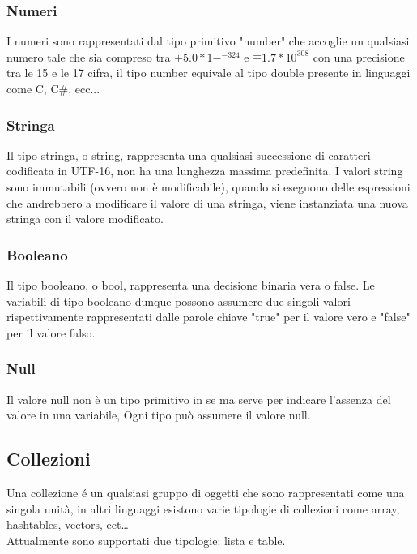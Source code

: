 \subsubsection{Numeri}
I numeri sono rappresentati dal tipo primitivo "number" che accoglie un qualsiasi numero tale che
sia compreso tra \( \pm5.0*1-^{-324} \) e \(\mp 1.7*10^308\) con una precisione tra le 15 e le 17
cifra, il tipo number equivale al tipo double presente in linguaggi come C, C\#, ecc...

\subsubsection{Stringa}
Il tipo stringa, o string, rappresenta una qualsiasi successione di caratteri codificata in UTF-16, 
non ha una lunghezza massima predefinita.
I valori string sono immutabili (ovvero non è modificabile), quando si eseguono delle espressioni
che andrebbero a modificare il valore di una stringa, viene instanziata una nuova stringa con il valore
modificato.

\subsubsection{Booleano}
Il tipo booleano, o bool, rappresenta una decisione binaria vera o false.
Le variabili di tipo booleano dunque possono assumere due singoli valori rispettivamente 
rappresentati dalle parole chiave "true" per il valore vero e "false" per il valore falso.

\subsubsection{Null}
Il valore null non è un tipo primitivo in se ma serve per indicare l'assenza del valore in una variabile,
Ogni tipo può assumere il valore null.

\subsection{Collezioni}
Una collezione é un qualsiasi gruppo di oggetti che sono rappresentati come una singola unità,
in altri linguaggi esistono varie tipologie di collezioni come array, hashtables, vectors, ect\dots \\
Attualmente sono supportati due tipologie: lista e table.

